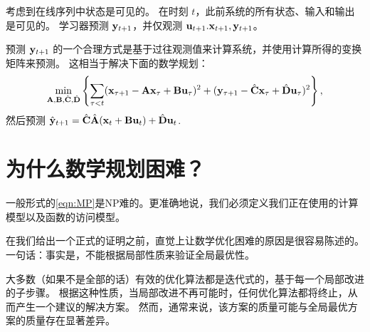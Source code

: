 考虑到在线序列中状态是可见的。
在时刻 $t$，此前系统的所有状态、输入和输出是可见的。
学习器预测 $\mathbf y_{t+1}$，并仅观测 $\mathbf u_{t+1}.\mathbf x_{t+1},\mathbf y_{t+1}$。

预测 $\mathbf y_{t+1}$ 的一个合理方式是基于过往观测值来计算系统，并使用计算所得的变换矩阵来预测。
这相当于解决下面的数学规划：
$$ \min_{\mathbf{A},\mathbf{B},\hat{\mathbf{C}},\hat{\mathbf{D}}} \left\{  \sum_{\tau < t }  ( \mathbf x_{\tau+1} - \mathbf{A} \mathbf x_\tau + \mathbf{B} \mathbf u_\tau )^2 + (\mathbf y_{\tau+1} - \hat{\mathbf{C}} \mathbf x_\tau + \hat{\mathbf{D}} \mathbf u_\tau )^2 \right \} , $$
然后预测
$\hat{\mathbf y}_{t+1} = \hat{\mathbf{C}} \hat{\mathbf{A}} (\mathbf x_t + \mathbf{B} \mathbf u_t)  + \hat{\mathbf{D}} \mathbf u_t$.


\section{
    为什么数学规划困难？
    } 

一般形式的\eqref{eqn:MP}是NP难的。更准确地说，我们必须定义我们正在使用的计算模型以及函数的访问模型。

在我们给出一个正式的证明之前，直觉上让数学优化困难的原因是很容易陈述的。
一句话：事实是，不能根据局部性质来验证全局最优性。

大多数（如果不是全部的话）有效的优化算法都是迭代式的，基于每一个局部改进的子步骤。
根据这种性质，当局部改进不再可能时，任何优化算法都将终止，从而产生一个建议的解决方案。
然而，通常来说，该方案的质量可能与全局最优方案的质量存在显著差异。

